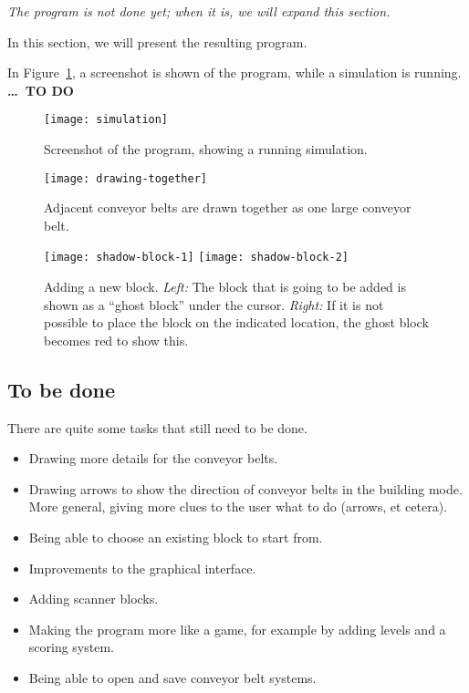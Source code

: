 \textit{The program is not done yet; when it is, we will expand this section.}

In this section, we will present the resulting program.

In Figure~\ref{fig:simulation}, a screenshot is shown of the program, while a simulation is running. \textbf{\ldots\ TO DO}

\begin{figure}
  \begin{center}
    \texttt{[image: simulation]}
    \caption{Screenshot of the program, showing a running simulation.}
    \label{fig:simulation}
  \end{center}
\end{figure}

\begin{figure}
  \begin{center}
    \texttt{[image: drawing-together]}
    \caption{Adjacent conveyor belts are drawn together as one large conveyor belt.}
    \label{fig:drawing-together}
  \end{center}
\end{figure}

\begin{figure}
  \begin{center}
    \texttt{[image: shadow-block-1]}
    \quad
    \texttt{[image: shadow-block-2]}
    \caption{Adding a new block. \textit{Left:} The block that is going to be added is shown as a ``ghost block'' under the cursor. \textit{Right:} If it is not possible to place the block on the indicated location, the ghost block becomes red to show this.}
    \label{fig:shadow-block}
  \end{center}
\end{figure}

\subsection{To be done}
There are quite some tasks that still need to be done.
\begin{itemize}
 \item Drawing more details for the conveyor belts.
 \item Drawing arrows to show the direction of conveyor belts in the building mode. More general, giving more clues to the user what to do (arrows, et cetera).
 \item Being able to choose an existing block to start from.
 \item Improvements to the graphical interface.
 \item Adding scanner blocks.
 \item Making the program more like a game, for example by adding levels and a scoring system.
 \item Being able to open and save conveyor belt systems.
\end{itemize}
